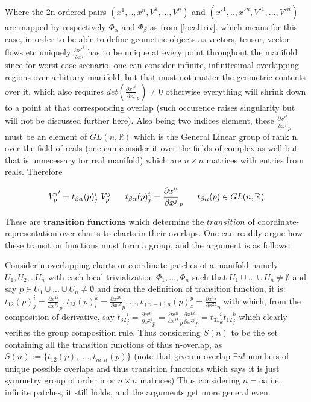 \documentclass[8pt, twocoloumn]{article}
\begin{document}
Where the 2n-ordered pairs $(x^1, . . , x^n, V^1, . . ., V^n)$ and $(x'^1, . . , x'^n, V'^1, . . ., V'^n)$ are mapped by respectively $\Phi_{\alpha}$ and $\Phi_{\beta}$ as from \ref{localtriv}. 
which means for this case, in order to be able to define geometric objects as vectors, tensor, vector flows etc uniquely $\frac{\partial x'^i}{\partial x^j }$ has to be unique at every point throughout the manifold since for worst case scenario, one can consider infinite, infinitesimal overlapping regions over arbitrary manifold, but that must not matter the geometric contents over it, which also requires $det(\frac{\partial x'^i}{\partial x^j }_p) \neq 0$ otherwise everything will shrink down to a point at that corresponding overlap (such occurence raises singularity but will not be discussed further here). Also being two indices element, these $\frac{\partial x'^i}{\partial x^j }_p$ must be an element of $GL(n, \mathbb{R})$ which is the General Linear group of rank n, over the field of reals (one can consider it over the fields of complex as well but that is unnecessary for real manifold) which are $n \times n $  matrices with entries from reals. 
Therefore

\begin{align}{\label{transiboii}}
    {V^{i}_{p}}' = t_{\beta \alpha}(p)^i_j \ V^j_p \ \ \ \ \ t_{\beta \alpha}(p)^i_j = \frac{\partial x'^i}{\partial x^j }_p \ \ \ \ \ t_{\beta \alpha}(p) \in GL(n, \mathbb{R})
\end{align}

These are $\textbf{transition functions}$ which determine the $transition$ of coordinate-representation over charts to charts in their overlaps. One can readily argue how these transition functions must form a group, and the argument is as follows: 

Consider n-overlapping charts or coordinate patches of a manifold namely $U_1, U_2, .. U_n$ with each local trivialization $\Phi_1, . . ., \Phi_n$ such that $U_1 \cup . . . \cup U_n \neq \emptyset$ and say $p \in U_1 \cup . . . \cup U_n \neq \emptyset$ and from the definition of transition function, it is: $t_{12}(p)^{i}_j = \frac{\partial x^{1i}}{\partial x^{2j} }_p,  t_{23}(p)^{k}_l = \frac{\partial x^{2k}}{\partial x^{3l} }_p, . . . , t_{(n-1)n}(p)^{y}_{z} = \frac{\partial x^{1y}}{\partial x^{2z} }_p$ with which, from the composition of derivative, say ${t_{32}}^i_{j} = {\frac{\partial x^{3i}}{\partial x^{2j} }}_p = \frac{\partial x^{3i}}{\partial x^{1k}}_p \frac{\partial x^{1k}}{\partial x^{2j} }_p = {t_{31}}^{i}_k {t_{12}}^{k}_j$ which clearly verifies the group composition rule. Thus considering $S(n)$ to be the set containing all the transition functions of thus n-overlap, as $S(n) := \{ t_{12}(p), . . . .,t_{m,n}(p)\}$ (note that given n-overlap $\exists n!$ numbers of unique possible overlaps and thus transition functions which says it is just symmetry group of order n or $n\times n$ matrices) Thus considering $n=\infty$ i.e. infinite patches, it still holds, and the arguments get more general even.
\end{document}
